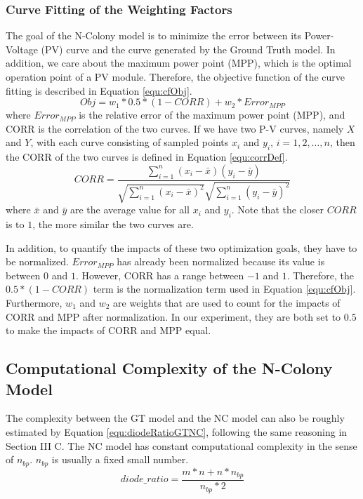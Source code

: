 \subsubsection{Curve Fitting of the Weighting Factors}
The goal of the N-Colony model is to minimize the error between its Power-Voltage (PV) curve and the curve generated by the Ground Truth model. In addition, we care about the maximum power point (MPP), which is the optimal operation point of a PV module. Therefore, the objective function of the curve fitting is described in Equation \ref{equ:cfObj}.
\begin{equation}\label{equ:cfObj}
Obj = w_1*0.5*(1-CORR)+ w_2*Error_{MPP}
\end{equation}
where $Error_{MPP}$ is the relative error of the maximum power point (MPP), and CORR is the correlation of the two curves. If we have two P-V curves, namely $X$ and $Y$, with each curve consisting of sampled points $x_i$ and $y_i$, $i=1,2,\dots,n$, then the CORR of the two curves is defined in Equation \ref{equ:corrDef}.
\begin{equation}\label{equ:corrDef}
CORR = \frac{\sum_{i=1}^n{(x_i - \bar{x})(y_i - \bar{y}) } } {\sqrt{\sum_{i=1}^n{(x_i - \bar{x})^2}}\sqrt{\sum_{i=1}^n{(y_i - \bar{y})^2}}}
\end{equation}
where $\bar{x}$ and $\bar{y}$ are the average value for all $x_i$ and $y_i$. Note that the closer $CORR$ is to $1$, the more similar the two curves are.

In addition, to quantify the impacts of these two optimization goals, they have to be normalized. $Error_{MPP}$ has already been normalized because its value is between $0$ and $1$. However, CORR has a range between $-1$ and $1$. Therefore, the $0.5*(1-CORR )$ term is the normalization term used in Equation \ref{equ:cfObj}. Furthermore, $w_1$  and $w_2$ are weights that are used to count for the impacts of CORR and MPP after normalization. In our experiment, they are both set to $0.5$ to make the impacts of CORR and MPP equal.

\subsection{Computational Complexity of the N-Colony Model}
The complexity between the GT model and the NC model can also be roughly estimated by Equation \ref{equ:diodeRatioGTNC}, following the same reasoning in Section III C. The NC model has constant computational complexity in the sense of $n_{bp}$. $n_{bp}$ is usually a fixed small number.
\begin{equation}\label{equ:diodeRatioGTNC}
  diode\_ratio = \frac{m*n+n*n_{bp}}{n_{bp}*2}
\end{equation}

